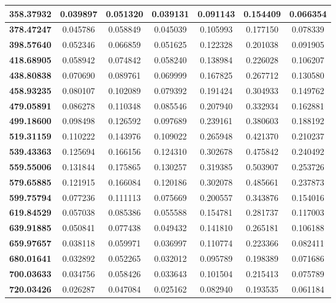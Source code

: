 \documentclass[11pt]{article}
\begin{document}
\begin{appendices}
\begin{table}[htbp]
\begin{center}
\begin{tabular}{|c|c|c|c|c|c|c|}
		\textbf{358.37932} & 0.039897 & 0.051320 & 0.039131 & 0.091143 & 0.154409 & 0.066354 \\ \hline
		\textbf{378.47247} & 0.045786 & 0.058849 & 0.045039 & 0.105993 & 0.177150 & 0.078339 \\ \hline
		\textbf{398.57640} & 0.052346 & 0.066859 & 0.051625 & 0.122328 & 0.201038 & 0.091905 \\ \hline
		\textbf{418.68905} & 0.058942 & 0.074842 & 0.058240 & 0.138984 & 0.226028 & 0.106207 \\ \hline
		\textbf{438.80838} & 0.070690 & 0.089761 & 0.069999 & 0.167825 & 0.267712 & 0.130580 \\ \hline
		\textbf{458.93235} & 0.080107 & 0.102089 & 0.079392 & 0.191424 & 0.304933 & 0.149762 \\ \hline
		\textbf{479.05891} & 0.086278 & 0.110348 & 0.085546 & 0.207940 & 0.332934 & 0.162881 \\ \hline
		\textbf{499.18600} & 0.098498 & 0.126592 & 0.097689 & 0.239161 & 0.380603 & 0.188192 \\ \hline
		\textbf{519.31159} & 0.110222 & 0.143976 & 0.109022 & 0.265948 & 0.421370 & 0.210237 \\ \hline
		\textbf{539.43363} & 0.125694 & 0.166156 & 0.124310 & 0.302678 & 0.475842 & 0.240492 \\ \hline
		\textbf{559.55006} & 0.131844 & 0.175865 & 0.130257 & 0.319385 & 0.503907 & 0.253726 \\ \hline
		\textbf{579.65885} & 0.121915 & 0.166084 & 0.120186 & 0.302078 & 0.485661 & 0.237873 \\ \hline
		\textbf{599.75794} & 0.077236 & 0.111113 & 0.075669 & 0.200557 & 0.343876 & 0.154016 \\ \hline
		\textbf{619.84529} & 0.057038 & 0.085386 & 0.055588 & 0.154781 & 0.281737 & 0.117003 \\ \hline
		\textbf{639.91885} & 0.050841 & 0.077438 & 0.049432 & 0.141810 & 0.265181 & 0.106188 \\ \hline
		\textbf{659.97657} & 0.038118 & 0.059971 & 0.036997 & 0.110774 & 0.223366 & 0.082411 \\ \hline
		\textbf{680.01641} & 0.032892 & 0.052265 & 0.032012 & 0.095789 & 0.198389 & 0.071686 \\ \hline
		\textbf{700.03633} & 0.034756 & 0.058426 & 0.033643 & 0.101504 & 0.215413 & 0.075789 \\ \hline
		\textbf{720.03426} & 0.026287 & 0.047084 & 0.025162 & 0.082940 & 0.193535 & 0.061184 \\ \hline

\end{tabular}
\end{center}
\end{table}
\end{appendices}
\end{document}
